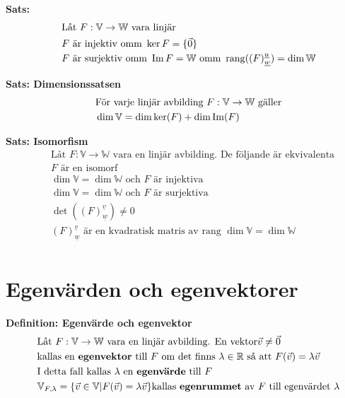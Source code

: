 \textbf{Sats:}
\begin{align*}
  &\quad  \text{Låt $F:\mathbb{V}\to\mathbb{W}$ vara linjär} \\
  &\quad  F \text{ är injektiv omm } \ker{F} = \{\vec{0}\} \\
  &\quad  F \text{ är surjektiv omm } \operatorname{Im}{F} = \mathbb{W} \text{ omm }
  \operatorname{rang} ({(F)}^{\underline{u}}_{\underline{w}}) = \dim{\mathbb{W}} \\
\end{align*}


\textbf{Sats: Dimensionssatsen}
\begin{align*}
  &\quad  \text{För varje linjär avbilding $F:\mathbb{V}\to\mathbb{W}$ gäller} \\
  &\quad  \dim{\mathbb{V}} = \dim{\ker(F)} + \dim{\operatorname{Im}(F)}  \\
\end{align*}

\textbf{Sats: Isomorfism}
\begin{align*}
  &\quad  \text{Låt $F:\mathbb{V}\to\mathbb{W}$ vara en linjär avbilding. De följande är ekvivalenta} \\
  &\quad  F \text{ är en isomorf} \\
  &\quad  \dim{\mathbb{V}} = \dim{\mathbb{W}} \text{ och $F$ är injektiva} \\
  &\quad  \dim{\mathbb{V}} = \dim{\mathbb{W}} \text{ och $F$ är surjektiva} \\
  &\quad  \det({(F)}^{\underline{v}}_{\underline{w}}) \neq 0 \\
  &\quad  {(F)}^{\underline{v}}_{\underline{w}} \text{ är en kvadratisk matris av rang }
  \dim{\mathbb{V}} = \dim{\mathbb{W}} \\
\end{align*}




\newpage

\section{Egenvärden och egenvektorer}
\textbf{Definition: Egenvärde och egenvektor}
\begin{align*}
  &\quad  \text{Låt $F:\mathbb{V}\to\mathbb{W}$ vara en linjär avbilding. En vektor} \vec{v}\neq\vec{0} \\
  &\quad  \text{kallas en \textbf{egenvektor} till $F$ om det finns $\lambda\in\mathbb{R}$ så att }
  F(\vec{v}) = \lambda\vec{v} \\
  &\quad  \text{I detta fall kallas $\lambda$ en \textbf{egenvärde} till $F$} \\
  &\quad  \mathbb{V}_{F,\lambda} = \{ \vec{v}\in\mathbb{V} | F(\vec{v}) = \lambda\vec{v} \}
  \text{kallas \textbf{egenrummet} av $F$ till egenvärdet $\lambda$} \\
\end{align*}


